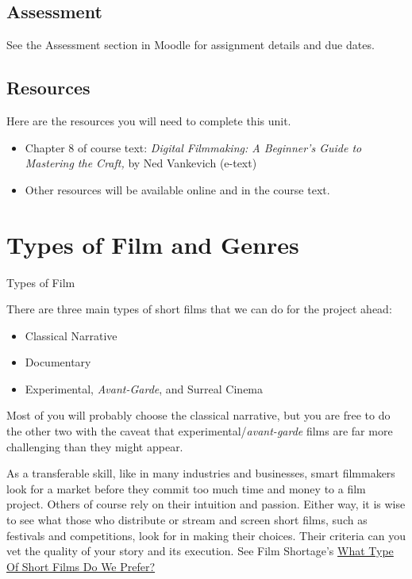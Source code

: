 \documentclass[
]{book}
\providecommand{\tightlist}{%
  \setlength{\itemsep}{0pt}\setlength{\parskip}{0pt}}
\begin{document}
\hypertarget{assessment-14}{%
\subsection*{Assessment}\label{assessment-14}}

See the Assessment section in Moodle for assignment details and due dates.

\hypertarget{resources-7}{%
\subsection*{Resources}\label{resources-7}}

Here are the resources you will need to complete this unit.

\begin{itemize}
\tightlist
\item
  Chapter 8 of course text: \emph{Digital Filmmaking: A Beginner's Guide to Mastering the Craft,} by Ned Vankevich (e-text)
\item
  Other resources will be available online and in the course text.
\end{itemize}

\hypertarget{types-of-film-and-genres}{%
\section{Types of Film and Genres}\label{types-of-film-and-genres}}

{Types of Film }

There are three main types of short films that we can do for the project ahead:

\begin{itemize}
\tightlist
\item
  Classical Narrative
\item
  Documentary
\item
  Experimental, \emph{Avant-Garde}, and Surreal Cinema
\end{itemize}

Most of you will probably choose the classical narrative, but you are free to do the other two with the caveat that experimental/\emph{avant-garde} films are far more challenging than they might appear.

As a transferable skill, like in many industries and businesses, smart filmmakers look for a market before they commit too much time and money to a film project. Others of course rely on their intuition and passion. Either way, it is wise to see what those who distribute or stream and screen short films, such as festivals and competitions, look for in making their choices. Their criteria can you vet the quality of your story and its execution. See Film Shortage's \href{https://filmshortage.com/what-we-like/}{What Type Of Short Films Do We Prefer?}
\end{document}
